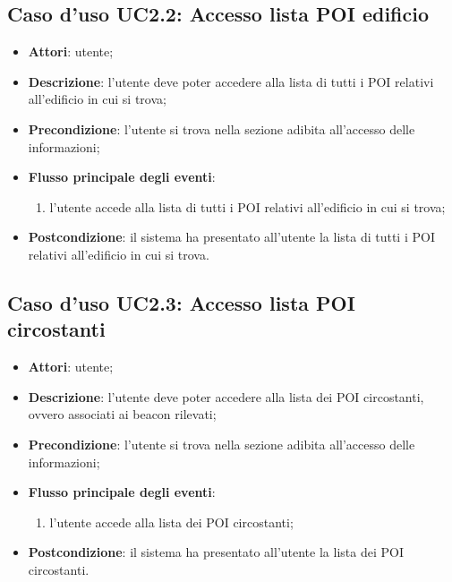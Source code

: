 \documentclass[../AnalisiDeiRequisiti.tex]{subfiles}
\begin{document}
\subsection{Caso d'uso UC2.2: Accesso lista POI edificio}
\begin{itemize}
\item \textbf{Attori}: utente;
\item \textbf{Descrizione}: l'utente deve poter accedere alla lista di tutti i POI relativi all'edificio in cui si trova; 
      \item \textbf{Precondizione}: l'utente si trova nella sezione adibita all'accesso delle informazioni;

        \item \textbf{Flusso principale degli eventi}:
          \begin{enumerate}
          \item l'utente accede alla lista di tutti i POI relativi all'edificio in cui si trova;

      \end{enumerate}
    \item \textbf{Postcondizione}: il sistema ha presentato all'utente la lista di tutti i POI relativi all'edificio in cui si trova.
  \end{itemize}
\hypertarget{UC2.3}{}
\subsection{Caso d'uso UC2.3: Accesso lista POI circostanti}
\begin{itemize}
\item \textbf{Attori}: utente;
\item \textbf{Descrizione}: l'utente deve poter accedere alla lista dei POI circostanti, ovvero associati ai beacon rilevati; 
      \item \textbf{Precondizione}: l'utente si trova nella sezione adibita all'accesso delle informazioni;

        \item \textbf{Flusso principale degli eventi}:
          \begin{enumerate}
          \item l'utente accede alla lista dei POI circostanti;

      \end{enumerate}
    \item \textbf{Postcondizione}: il sistema ha presentato all'utente la lista dei POI circostanti.
  \end{itemize}
\hypertarget{UC2.4}{}
\end{document}
